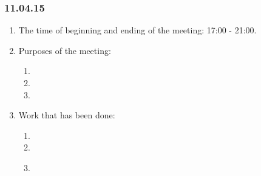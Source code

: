 \subsubsection{11.04.15}
\begin{enumerate}
	
	\item The time of beginning and ending of the meeting: 17:00 - 21:00.
	
	\item Purposes of the meeting: 
	\begin{enumerate}
		
		\item 
		
		\item 
		
        \item 
		
	\end{enumerate}

	\item Work that has been done:
	\begin{enumerate}
		
		\item 
		
		\item 
		
        \item 
		
        \begin{figure}[H]
	  	  \begin{minipage}[h]{0.2\linewidth}
	  	    \center  
	  	  \end{minipage}
	  	  \begin{minipage}[h]{0.6\linewidth}
	  		\caption{}
	  	  \end{minipage}
	   \end{figure}


\end{enumerate}
\end{enumerate}
